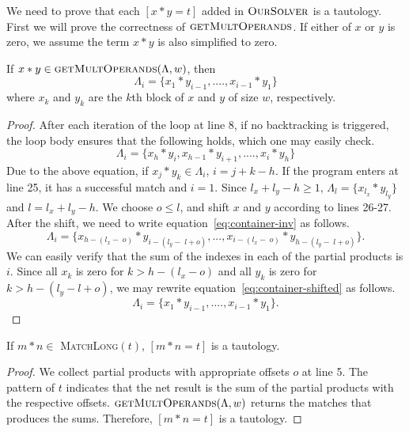 We need to prove that each $[x*y = t]$ added in $\textsc{OurSolver}$
is a tautology.
%
First we will prove the correctness of $\textsc{getMultOperands}$.
%
If either of $x$ or $y$ is zero, we assume the term $x*y$ is also simplified to zero.
\begin{thm}
 If $ x*y \in \textsc{getMultOperands}(\Lambda,w)$, then
 $$
 \Lambda_i = \{ x_1*y_{i-1},....,x_{i-1}*y_1 \}
 $$
  where $x_k$ and $y_k$ are the $k$th block of $x$ and $y$ of size
$w$, respectively.
\end{thm}
\begin{proof}
  After each iteration of the loop at line 8,
  if no backtracking is triggered, the loop body ensures
  that the following holds, which one may easily check.
  \begin{equation}
    \label{eq:container-inv}
  \Lambda_i = \{ x_h*y_{i}, x_{h-1}*y_{i+1},....,x_{i}*y_h \}    
  \end{equation}
  Due to the above equation,
  if $x_j*y_k \in \Lambda_i$, $ i = j+k-h$.
  If the program enters at line 25, it has a successful match and $i=1$.
  Since $l_x +l_y-h \geq 1$, $\Lambda_l = \{x_{l_x}*y_{l_y}\}$
  and $l = l_x +l_y-h$.
  We choose $o \leq l$, and shift $x$ and $y$ according to lines 26-27.
  After the shift, we need to write equation~\eqref{eq:container-inv}
  as follows.
  \begin{equation}
    \label{eq:container-shifted}
    \Lambda_i = \{ x_{h-(l_x-\;o)}*y_{i-(l_y-\;l+o)},...,x_{i-(l_x-\;o)}*y_{h-(l_y-\;l+o)} \}.
  \end{equation}
  We can easily verify that the sum of the indexes in each of
  the partial products is $i$.
  Since all $x_k$ is zero for $k > h-(l_x-o)$ and all $y_k$ is zero
  for $k > h-(l_y-l+o)$,
  we may rewrite equation~\eqref{eq:container-shifted}
 as follows.
  $$
  \Lambda_i = \{ x_1*y_{i-1},....,x_{i-1}*y_1 \}.
  $$
\end{proof}

\begin{thm}
  If $m*n\in$ \textsc{MatchLong}$(t)$, $[m*n = t]$ is a tautology.
\end{thm}
\begin{proof}
  We collect partial products with appropriate offsets $o$ at line 5.
  The pattern of $t$ indicates that the net result is the sum of the 
  partial products with the respective offsets. 
  $\textsc{getMultOperands}(\Lambda,w)$ returns the
  matches that produces the sums.
  Therefore, $[m*n = t]$ is a tautology.
\end{proof}

